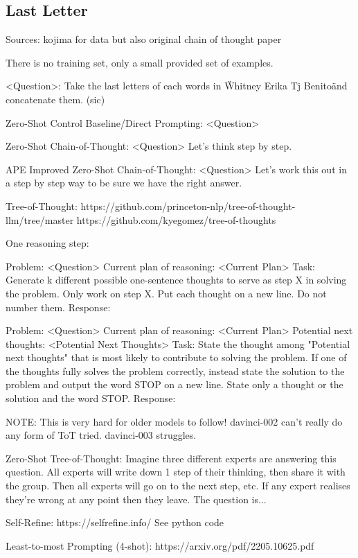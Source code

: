 \documentclass[11pt]{article}
\begin{document}
\subsection{Last Letter}

Sources: kojima for data but also original chain of thought paper

There is no training set, only a small provided set of examples.

<Question>: Take the last letters of each words in \"Whitney Erika Tj Benito\" and concatenate them. (sic)

Zero-Shot Control Baseline/Direct Prompting:
<Question>

Zero-Shot Chain-of-Thought:
<Question>
Let's think step by step.

APE Improved Zero-Shot Chain-of-Thought:
<Question>
Let's work this out in a step by step way to be sure we have the right answer.

Tree-of-Thought: https://github.com/princeton-nlp/tree-of-thought-llm/tree/master https://github.com/kyegomez/tree-of-thoughts

One reasoning step:

Problem:
<Question> 
Current plan of reasoning:
<Current Plan>
Task:
Generate {k} different possible one-sentence thoughts to serve as step {X} in solving the problem. Only work on step {X}. Put each thought on a new line. Do not number them.
Response:

Problem:
<Question> 
Current plan of reasoning:
<Current Plan>
Potential next thoughts:
<Potential Next Thoughts>
Task:
State the thought among "Potential next thoughts" that is most likely to contribute to solving the problem. If one of the thoughts fully solves the problem correctly, instead state the solution to the problem and output the word STOP on a new line. State only a thought or the solution and the word STOP.
Response:

NOTE: This is very hard for older models to follow! davinci-002 can't really do any form of ToT tried. davinci-003 struggles.

Zero-Shot Tree-of-Thought:
Imagine three different experts are answering this question.
All experts will write down 1 step of their thinking,
then share it with the group.
Then all experts will go on to the next step, etc.
If any expert realises they're wrong at any point then they leave.
The question is...

Self-Refine: https://selfrefine.info/
See python code

Least-to-most Prompting (4-shot): https://arxiv.org/pdf/2205.10625.pdf
\end{document}
